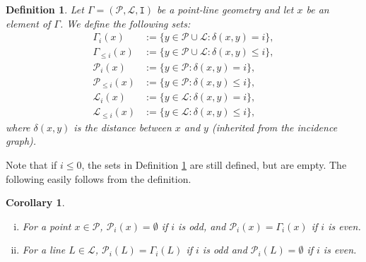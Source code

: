 \documentclass[12pt]{article}
\newcommand{\Points}{\mathcal{P}}
\newcommand{\Lines}{\mathcal{L}}
\newcommand{\I}{\mathtt{I}}
\newtheorem{definition}{Definition}
\newtheorem{corollary}{Corollary}
\theoremstyle{remark}
\begin{document}
\begin{definition}\label{GammaSets}\label{def:GammaSets}
	Let $\Gamma=(\Points,\Lines, \I)$ be a point-line geometry and let $x$ be an element of $\Gamma$. We define the following sets:
	\begin{align*}
		\Gamma_i(x) &:= \{y \in \Points\cup \Lines : \delta(x,y) = i\}, \\
		\Gamma_{\le i}(x) &:= \{y \in \Points\cup\Lines: \delta(x,y) \le i\}, \\
		\Points_i(x) &:= \{y \in \Points: \delta(x,y) = i\}, \\
		\Points_{\le i}(x) &:= \{y \in \Points: \delta(x,y) \le i\}, \\ 
		\Lines_i(x) &:= \{y \in \Lines: \delta(x,y) = i\}, \\
		\Lines_{\le i}(x) &:= \{y \in \Lines: \delta(x,y) \le i\} ,
	\end{align*}
	where \(\delta(x,y)\) is the distance between \(x\) and \(y\) (inherited from the incidence graph).
\end{definition}
Note that if $i\leq 0$, the sets in Definition \ref{GammaSets} are still defined, but are empty. The following easily follows from the definition.
\begin{corollary}\label{gammaProperties}
	\begin{enumerate}[(i)]
		\item For a point \(x\in\Points\), \(\Points_i(x) = \emptyset\) if $i$ is odd, and   \(\Points_i(x) = \Gamma_i(x)\) if $i$ is even.
		\item For a line \(L\in\Lines\), \(\Points_i(L) = \Gamma_i(L)\) if $i$ is odd and \(\Points_i(L) = \emptyset\) if $i$ is even. 
	\end{enumerate}
\end{corollary}
\end{document}
